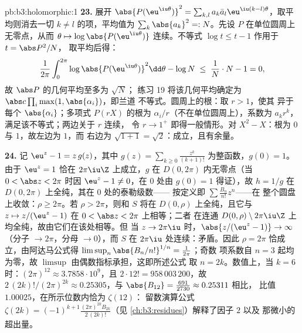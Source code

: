 \begin{solution}{pb:b3:holomorphic:1}
\textbf{23.} 展开
$\abs{P(\eu^{\iu\theta})}^2 = \sum_{k,l}a_k\bar a_l
\eu^{\iu(k-l)\theta}$，取平均则消去一切 $k \neq
l$ 的项，平均值为 $\sum_k\abs{a_k}^2 =: N$。先设
$P$ 在单位圆周上无零点，从而 $\theta \mapsto
\log\abs{P(\eu^{\iu\theta})}$ 连续。不等式 $\log
t \leq t - 1$ 作用于 $t = \abs P^2/N$，
取平均后得：
\[
\frac1{2\pi}\int_0^{2\pi}\log\abs{P(\eu^{\iu\theta})}^2
\dd\theta - \log N
\;\leq\; \frac1N\cdot N - 1 = 0,
\]
故 $\abs P$ 的几何平均至多为 $\sqrt N$；
练习 19 将该几何平均确定为
$\abs c\prod_i\max(1, \abs{\alpha_i})$，即兰道
不等式。圆周上的根：取 $r > 1$，使其
异于每个 $\abs{\alpha_i}$；多项式 $P(rX)$ 的根为
$\alpha_i/r$（不在单位圆周上），系数为 $a_kr^k$，
满足该不等式；两边关于 $r$ 连续，
令 $r \to 1^+$ 即得一般情形。对 $X^2 -
X$：根为 $0$ 与 $1$，故左边为 $1$，而
右边为 $\sqrt{1 + 1} = \sqrt2$：成立，且有余量。

\textbf{24.} 记 $\eu^z - 1 = z\,g(z)$，其中 $g(z) =
\sum_{k\geq0}\frac{z^k}{(k+1)!}$ 为整函数，$g(0) = 1$。由于
$\eu^z = 1$ 恰在 $2\pi\iu\Z$ 上成立，$g$ 在
$D(0, 2\pi)$ 内无零点（当 $0 < \abs z < 2\pi$ 时因 $\eu^z - 1
\neq 0$，在 $0$ 处由 $g(0) = 1$ 得证），故 $h = 1/g$ 在
$D(0,2\pi)$ 上全纯，其在 $0$ 处的泰勒级数——
按定义即 $\sum\frac{B_n}{n!}z^n$——在
整个圆盘上收敛：$\rho \geq 2\pi$。若 $\rho > 2\pi$，则和 $S$
将在 $D(0,\rho)$ 上全纯，且它与 $z
\mapsto z/(\eu^z - 1)$ 在 $0 < \abs z < 2\pi$ 上相等；二者
在连通 $D(0,\rho) \setminus
2\pi\iu\Z$ 上均全纯，故由它们在该处相等。但
当 $z \to 2\pi\iu$ 时，$\abs{z/(\eu^z - 1)} \to \infty$
（分子 $\to 2\pi$，分母 $\to 0$），而 $S$
在 $2\pi\iu$ 处连续：矛盾。因此 $\rho = 2\pi$
恰成立，由阿达马公式得
$\limsup_n\abs{B_n/n!}^{1/n} = \frac1{2\pi}$；奇数
项系数自 $n = 3$ 起均为零，故 $\limsup$
由偶数指标承担，这即所述公式
取 $n = 2k$。数值上，当 $k = 6$ 时：$(2\pi)^{12} \approx
3.7858\cdot10^9$，且 $2\cdot12! = 958\,003\,200$，故
$2\,(2k)!/(2\pi)^{2k} \approx 0.25305$，与
$\abs{B_{12}} = \frac{691}{2730} \approx 0.25311$ 相比，
比值 $1.00025$，在所示位数内恰为 $\zeta(12)$：
留数演算公式 $\zeta(2k) =
(-1)^{k+1}\frac{(2\pi)^{2k}B_{2k}}{2\,(2k)!}$（见
\cref{ch:b3:residues}）解释了因子 $2$ 以及
那微小的超出量。


\end{solution}
